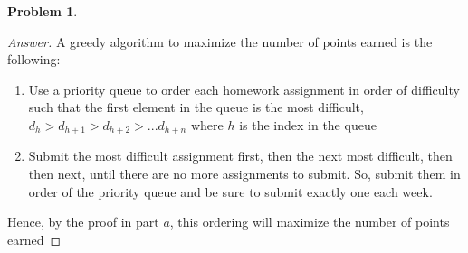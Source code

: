 \documentclass[11pt]{article}
\theoremstyle{definition}
\theoremstyle{definition}
\newtheorem{required}{Problem}
\theoremstyle{definition}
\begin{document}
\begin{required}
\begin{enumerate}[label=(\alph*)]
\begin{proof}[Answer]
A greedy algorithm to maximize the number of points earned is the following:
\begin{enumerate}
\item Use a priority queue to order each homework assignment in order of difficulty such that the first element in the queue is the most difficult, $d_{h} > d_{h+1} > d_{h+2} > ... d_{h+n}$ where $h$ is the index in the queue
\item Submit the most difficult assignment first, then the next most difficult, then then next, until there are no more assignments to submit. So, submit them in order of the priority queue and be sure to submit exactly one each week. 
\end{enumerate}
Hence, by the proof in part $a$, this ordering will maximize the number of points earned
\end{proof}

\end{enumerate}
\end{required}




\end{document}
